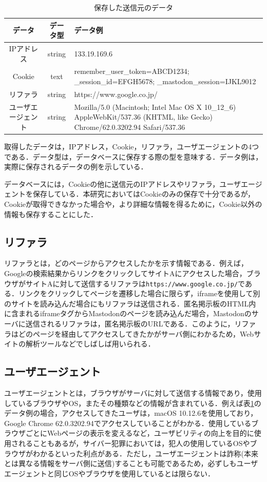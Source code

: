 \documentclass[10pt, a4paper]{jreport}
\begin{document}
\begin{table}[H]
	\caption{保存した送信元のデータ}
	\label{tb: buttons_database}
	\begin{center}
		\begin{tabular}{ | c | c | p{8cm} | } \hline
			データ & データ型 & データ例 \\ \hline
			IPアドレス & string & 133.19.169.6 \\ \hline
			Cookie & text & remember\_user\_token=ABCD1234; \_session\_id=EFGH5678; \_mastodon\_session=IJKL9012  \\ \hline
			リファラ & string & https://www.google.co.jp/ \\ \hline
			ユーザエージェント & string &  Mozilla/5.0 (Macintosh; Intel Mac OS X 10\_12\_6) AppleWebKit/537.36 (KHTML, like Gecko) Chrome/62.0.3202.94 Safari/537.36 \\ \hline
		\end{tabular}
	\end{center}
\end{table}

取得したデータは，IPアドレス，Cookie，リファラ，ユーザエージェントの4つである．データ型は，データベースに保存する際の型を意味する．データ例は，実際に保存されるデータの例を示している．

データベースには，Cookieの他に送信元のIPアドレスやリファラ，ユーザエージェントを保存している．本研究においてはCookieのみの保存で十分であるが，Cookieが取得できなかった場合や，より詳細な情報を得るために，Cookie以外の情報も保存することにした．

\subsection*{リファラ}
リファラとは，どのページからアクセスしたかを示す情報である．例えば，Googleの検索結果からリンクをクリックしてサイトAにアクセスした場合，ブラウザがサイトAに対して送信するリファラは\verb|https://www.google.co.jp/|である．リンクをクリックしてページを遷移した場合に限らず，iframeを使用して別のサイトを読み込んだ場合にもリファラは送信される．匿名掲示板のHTML内に含まれるiframeタグからMastodonのページを読み込んだ場合，Mastodonのサーバに送信されるリファラは，匿名掲示板のURLである．このように，リファラはどのページを経由してアクセスしてきたかがサーバ側にわかるため，Webサイトの解析ツールなどでしばしば用いられる．

\subsection*{ユーザエージェント}
ユーザエージェントとは，ブラウザがサーバに対して送信する情報であり，使用しているブラウザやOS，またその種類などの情報が含まれている．例えば表\ref{tb: buttons_database}のデータ例の場合，アクセスしてきたユーザは，macOS 10.12.6を使用しており，Google Chrome 62.0.3202.94でアクセスしていることがわかる．使用しているブラウザごとにWebページの表示を変えるなど，ユーザビリティの向上を目的に使用されることもあるが，サイバー犯罪においては，犯人の使用しているOSやブラウザがわかるといった利点がある．ただし，ユーザエージェントは詐称(本来とは異なる情報をサーバ側に送信)することも可能であるため，必ずしもユーザエージェントと同じOSやブラウザを使用しているとは限らない．
\end{document}
